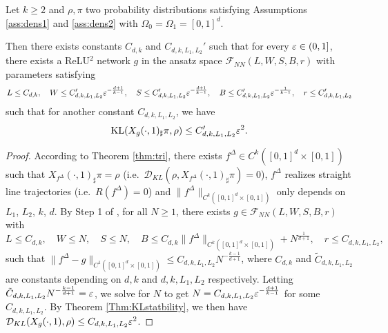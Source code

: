 \begin{proposition}\label{Prop:KLerrorNN}
    
Let $k \geq 2$ and $\rho, \pi$ two probability distributions satisfying Assumptions \ref{ass:dens1} and \ref{ass:dens2} with $\Omega_0 = \Omega_1 = [0,1]^d$.

Then there exists constants $C_{d,k}$
and $C_{d,k,L_1,L_2}'$
such that for every $\varepsilon\in(0,1]$, there exists a ReLU$^2$ network $g$ in the ansatz space $\mathcal{F}_{NN}(L, W, S, B, r) $ with parameters satisfying
\begin{equation*}
  L \leq C_{d,k},\quad
  W \leq C_{d, k, L_1, L_2}'\varepsilon^{-\frac{d+1}{k-1}},\quad
  S\leq C_{d, k, L_1, L_2}'\varepsilon^{-\frac{d+1}{k-1}},\quad
  B\leq C_{d, k, L_1,L_2}'\varepsilon^{-\frac{1}{k-1}},\quad
  r\leq C_{d, k, L_1, L_2}'
\end{equation*}
  such that for another constant $C_{d, k, L_1, L_2}$, we have 
\[ \mathrm{KL}(X_g(\cdot,1)_\sharp \pi, \rho)\leq C_{d, k ,L_1, L_2}'\varepsilon^2.\]
\end{proposition}
\begin{proof}
According to Theorem \ref{thm:tri}, there exists
  $f^\Delta\in C^k([0,1]^d\times [0,1])$ such that
  $X_{f^\Delta}(\cdot,1)_\sharp\pi=\rho$ (i.e.\
  $\mathcal{D}_{KL}(\rho,X_{f^\Delta}(\cdot,1)_\sharp\pi)=0$), $f^\Delta$ realizes straight line
  trajectories (i.e.\ $R(f^\Delta)=0$) and $\|f^\Delta\|_{C^k([0,1]^d\times [0,1])}$
  only depends on $L_1$, $L_2$, $k$, $d$. By Step 1 of \cite[Theorem 20]{StatisticalNODE}, for all $N \geq 1$,  there exists %
  $g\in \mathcal{F}_{NN}(L, W, S, B, r)$ with
  \begin{equation*}
    L \leq C_{d, k},\quad W \leq N,\quad S \leq N,\quad B \leq C_{d,k}\|f^\Delta\|_{C^k([0,1]^d\times [0,1])} + N^{\frac{1}{d+1}},\quad
    r \leq C_{d, k, L_1, L_2},
  \end{equation*}
  such that $\|f^\Delta- g\|_{C^1([0,1]^d\times[0,1])} \leq C_{d, k, L_1, L_2}N^{-\frac{k-1}{d+1}}$, where $C_{d,k}$ and $\tilde C_{d, k, L_1, L_2}$ are constants depending on $d, k$ and $d, k, L_1, L_2$ respectively. Letting $\tilde C_{d, k, L_1, L_2}N^{-\frac{k-1}{d+1}} = \varepsilon$, we solve for $N$ to get $N = C_{d, k, L_1, L_2}\varepsilon^{-\frac{d+1}{k-1}}$
  for some $C_{d,k,L_1,L_2}$. By Theorem \ref{Thm:KLstatbility}, we then have $\mathcal{D}_{KL}(X_g(\cdot,1), \rho) \leq C_{d, k, L_1, L_2}\varepsilon^2$. 
\end{proof}











